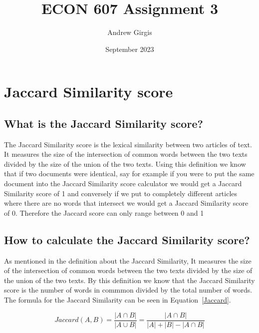 \documentclass{article}
\title{ECON 607 Assignment 3}
\author{Andrew Girgis}
\date{September 2023}
\begin{document}
\maketitle

\newpage

\tableofcontents

\newpage

\listoffigures

\newpage

\doublespacing

\section{Jaccard Similarity score}
\subsection{What is the Jaccard Similarity score?}
The Jaccard Similarity score is the lexical similarity between two articles of text. It measures the size of the intersection of common words between the two texts divided by the size of the union of the two texts. Using this definition we know that if two documents were identical, say for example if you were to put the same document into the Jaccard Similarity score calculator we would get a Jaccard Similarity score of 1 and conversely if we put to completely different articles where there are no words that intersect we would get a Jaccard Similarity score of 0. Therefore the Jaccard score can only range between 0 and 1

\subsection{How to calculate the Jaccard Similarity score?}
As mentioned in the definition about the Jaccard Similarity, It measures the size of the intersection of common words between the two texts divided by the size of the union of the two texts. By this definition we know that the Jaccard Similarity score is the number of words in commmon divided by the total number of words. The formula for the Jaccard Similarity can be seen in Equation~\ref{Jaccard}.

\begin{equation}
Jaccard(A,B) = \frac{|A \cap B|}{|A \cup B|} = \frac{|A \cap B|}{|A| + |B| - |A \cap B|}
\label{Jaccard}
\end{equation}
\end{document}
